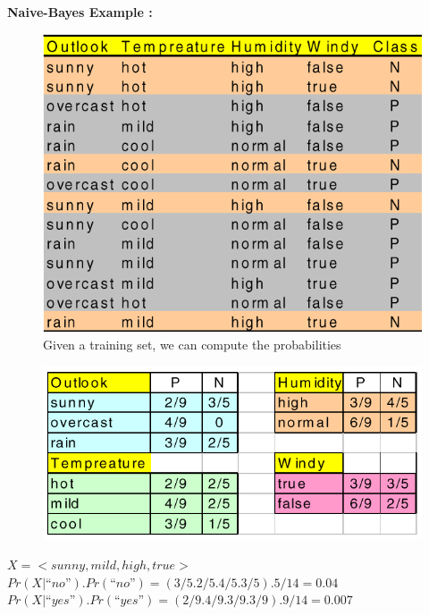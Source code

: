 \documentclass[a4paper,12pt]{article}
\begin{document}
{			\textbf{Naive-Bayes Example : }
			\begin{center}
				\begin{figure}[!htbp]
					\centering
					\includegraphics{nb1.png}
					\caption{Given a training set, we can compute the probabilities}
				\end{figure}
			\end{center} 
			\newpage
				\begin{center}
					\begin{figure}[!htbp]
						\centering
						\includegraphics{nb2.png}
					\end{figure}
				\end{center}
			

			$X = <sunny, mild, high, true>$
			\\
			$Pr(X | “no”).Pr(“no”) = (3/5 . 2/5 . 4/5 . 3/5) . 5/14 = 0.04$
			\\
			$Pr(X | “yes”).Pr(“yes”) = (2/9 . 4/9 . 3/9 . 3/9) . 9/14 = 0.007$
			\\
		
		
		
		
		
		
		
		
		
		
		
		
		
		
		
		
		
		
		
		}
	
\end{document}
